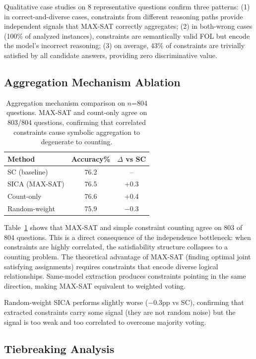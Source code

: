 \documentclass[11pt,a4paper]{article}
\begin{document}
Qualitative case studies on 8 representative questions confirm three patterns: (1) in correct-and-diverse cases, constraints from different reasoning paths provide independent signals that MAX-SAT correctly aggregates; (2) in both-wrong cases (100\% of analyzed instances), constraints are semantically valid FOL but encode the model's incorrect reasoning; (3) on average, 43\% of constraints are trivially satisfied by all candidate answers, providing zero discriminative value.

\subsection{Aggregation Mechanism Ablation}

\begin{table}[t]
\centering
\small
\caption{Aggregation mechanism comparison on $n$=804 questions. MAX-SAT and count-only agree on 803/804 questions, confirming that correlated constraints cause symbolic aggregation to degenerate to counting.}
\label{tab:aggregation}
\begin{tabular}{lcc}
\toprule
\textbf{Method} & \textbf{Accuracy\%} & \textbf{$\Delta$ vs SC} \\
\midrule
SC (baseline) & 76.2 & -- \\
SICA (MAX-SAT) & 76.5 & +0.3 \\
Count-only & 76.6 & +0.4 \\
Random-weight & 75.9 & $-$0.3 \\
\bottomrule
\end{tabular}
\end{table}

Table~\ref{tab:aggregation} shows that MAX-SAT and simple constraint counting agree on 803 of 804 questions. This is a direct consequence of the independence bottleneck: when constraints are highly correlated, the satisfiability structure collapses to a counting problem. The theoretical advantage of MAX-SAT (finding optimal joint satisfying assignments) requires constraints that encode diverse logical relationships. Same-model extraction produces constraints pointing in the same direction, making MAX-SAT equivalent to weighted voting.

Random-weight SICA performs slightly worse ($-$0.3pp vs SC), confirming that extracted constraints carry some signal (they are not random noise) but the signal is too weak and too correlated to overcome majority voting.

\subsection{Tiebreaking Analysis}
\end{document}
